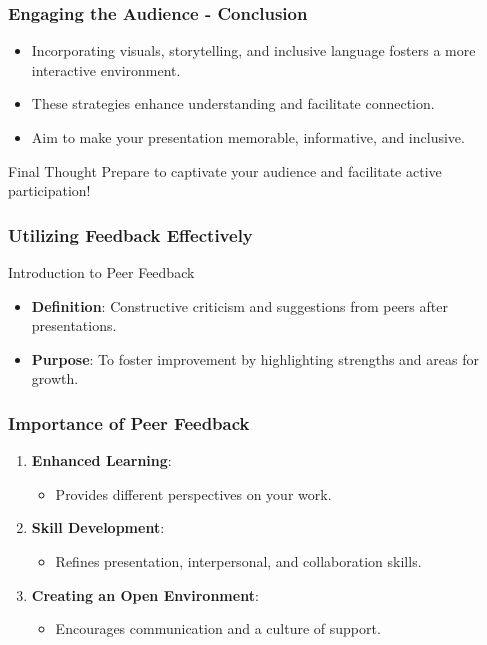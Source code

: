 \documentclass[aspectratio=169]{beamer}
\begin{document}
\begin{frame}[fragile]
  \frametitle{Engaging the Audience - Conclusion}
  \begin{itemize}
      \item Incorporating visuals, storytelling, and inclusive language fosters a more interactive environment.
      \item These strategies enhance understanding and facilitate connection.
      \item Aim to make your presentation memorable, informative, and inclusive.
  \end{itemize}

  \begin{block}{Final Thought}
      Prepare to captivate your audience and facilitate active participation!
  \end{block}
\end{frame}

\begin{frame}[fragile]
    \frametitle{Utilizing Feedback Effectively}
    \begin{block}{Introduction to Peer Feedback}
        \begin{itemize}
            \item \textbf{Definition}: Constructive criticism and suggestions from peers after presentations.
            \item \textbf{Purpose}: To foster improvement by highlighting strengths and areas for growth.
        \end{itemize}
    \end{block}
\end{frame}

\begin{frame}[fragile]
    \frametitle{Importance of Peer Feedback}
    \begin{enumerate}
        \item \textbf{Enhanced Learning}:
            \begin{itemize}
                \item Provides different perspectives on your work.
            \end{itemize}
        \item \textbf{Skill Development}:
            \begin{itemize}
                \item Refines presentation, interpersonal, and collaboration skills.
            \end{itemize}
        \item \textbf{Creating an Open Environment}:
            \begin{itemize}
                \item Encourages communication and a culture of support.
            \end{itemize}
    \end{enumerate}
\end{frame}
\end{document}
